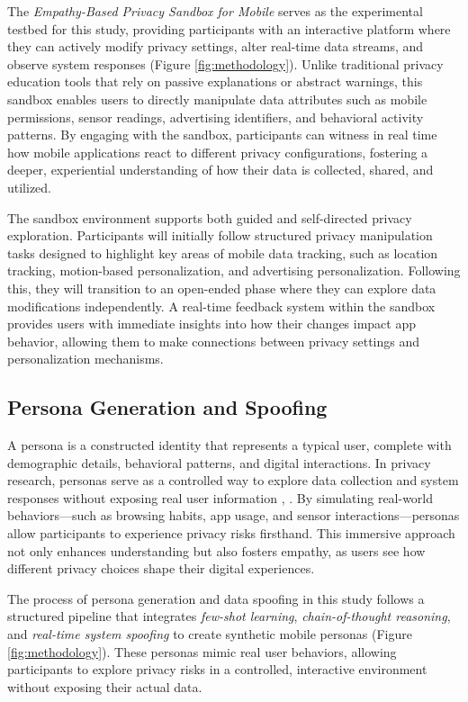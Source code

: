 \documentclass[acmlarge, nonacm]{acmart}
\begin{document}
The \textit{Empathy-Based Privacy Sandbox for Mobile} serves as the experimental testbed for this study, providing participants with an interactive platform where they can actively modify privacy settings, alter real-time data streams, and observe system responses (Figure \ref{fig:methodology}). Unlike traditional privacy education tools that rely on passive explanations or abstract warnings, this sandbox enables users to directly manipulate data attributes such as mobile permissions, sensor readings, advertising identifiers, and behavioral activity patterns. By engaging with the sandbox, participants can witness in real time how mobile applications react to different privacy configurations, fostering a deeper, experiential understanding of how their data is collected, shared, and utilized.

The sandbox environment supports both guided and self-directed privacy exploration. Participants will initially follow structured privacy manipulation tasks designed to highlight key areas of mobile data tracking, such as location tracking, motion-based personalization, and advertising personalization. Following this, they will transition to an open-ended phase where they can explore data modifications independently. A real-time feedback system within the sandbox provides users with immediate insights into how their changes impact app behavior, allowing them to make connections between privacy settings and personalization mechanisms.
\subsection{Persona Generation and Spoofing}

A persona is a constructed identity that represents a typical user, complete with demographic details, behavioral patterns, and digital interactions. In privacy research, personas serve as a controlled way to explore data collection and system responses without exposing real user information \cite{persona}, \cite{Chaoran2023EmpathySandbox}. By simulating real-world behaviors—such as browsing habits, app usage, and sensor interactions—personas allow participants to experience privacy risks firsthand. This immersive approach not only enhances understanding but also fosters empathy, as users see how different privacy choices shape their digital experiences.

The process of persona generation and data spoofing in this study follows a structured pipeline that integrates \textit{few-shot learning}, \textit{chain-of-thought reasoning}, and \textit{real-time system spoofing} to create synthetic mobile personas (Figure \ref{fig:methodology}). These personas mimic real user behaviors, allowing participants to explore privacy risks in a controlled, interactive environment without exposing their actual data.
\end{document}
